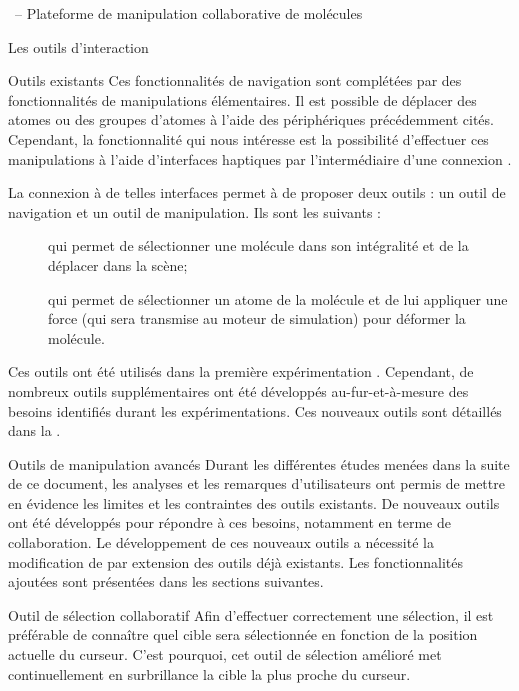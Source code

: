 \documentclass[myfrancais,ngerman,english,frenchb]{mythesis}
\begin{document}
\begin{mychapter}{\myShaddock\ -- Plateforme de manipulation collaborative de molécules}
\begin{mysection}{Les outils d'interaction}
\begin{mysubsection}{Outils existants}
				Ces fonctionnalités de navigation sont complétées par des fonctionnalités de manipulations élémentaires.
				Il est possible de déplacer des atomes ou des groupes d'atomes à l'aide des périphériques précédemment cités.
				Cependant, la fonctionnalité qui nous intéresse est la possibilité d'effectuer ces manipulations à l'aide d'interfaces haptiques par l'intermédiaire d'une connexion  .

				La connexion à de telles interfaces permet à  de proposer deux outils : un outil de navigation et un outil de manipulation.
				Ils sont les suivants :
				\begin{description}
					\item[] qui permet de sélectionner une molécule dans son intégralité et de la déplacer dans la scène;
					\item[] qui permet de sélectionner un atome de la molécule et de lui appliquer une force (qui sera transmise au moteur de simulation) pour déformer la molécule.
				\end{description}
				Ces outils ont été utilisés dans la première expérimentation .
				Cependant, de nombreux outils supplémentaires ont été développés au-fur-et-à-mesure des besoins identifiés durant les expérimentations.
				Ces nouveaux outils sont détaillés dans la .
			\end{mysubsection}
			\begin{mysubsection}{Outils de manipulation avancés}
				Durant les différentes études menées dans la suite de ce document, les analyses et les remarques d'utilisateurs ont permis de mettre en évidence les limites et les contraintes des outils existants.
				De nouveaux outils ont été développés pour répondre à ces besoins, notamment en terme de collaboration.
				Le développement de ces nouveaux outils a nécessité la modification de  par extension des outils déjà existants.
				Les fonctionnalités ajoutées sont présentées dans les sections suivantes.
				\begin{mysubsubsection}{Outil de sélection collaboratif}
					Afin d'effectuer correctement une sélection, il est préférable de connaître \myapriori quel cible sera sélectionnée en fonction de la position actuelle du curseur.
					C'est pourquoi, cet outil de sélection amélioré met continuellement en surbrillance la cible la plus proche du curseur.

\end{mysubsubsection}
\end{mysubsection}
\end{mysection}
\end{mychapter}
\end{document}
